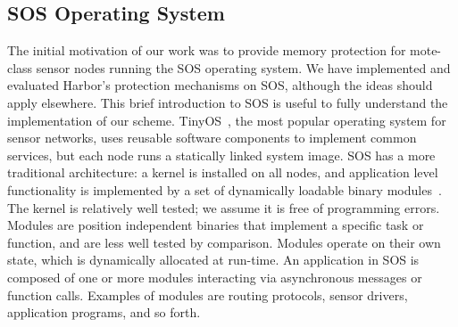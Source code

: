\subsection{SOS Operating System}
\label{sec:background}
% 
The initial motivation of our work was to provide memory protection
for mote-class sensor nodes running the SOS operating system.
% 
% 
We have implemented and evaluated Harbor's protection mechanisms on
SOS, although the ideas should apply elsewhere.
% 
This brief introduction to SOS is useful to fully understand the
implementation of our scheme.
% 
% 
% 
TinyOS~\cite{levis05t2}, the most popular operating system for sensor
networks, uses reusable software components to implement common
services, but each node runs a statically linked system image.
% 
% 
% 
SOS has a more traditional architecture: a kernel is
installed on all nodes, and
% 
application level functionality is implemented by a set of dynamically
loadable binary modules~\cite{ram05sos}.
% 
% 
% 
% 
% 
% 
% 
% 
% 
The kernel is relatively well tested; we assume it is free of
programming errors.
% 
Modules are position independent binaries that implement a specific
task or function, and are less well tested by comparison.
% 
Modules operate on their own state, which is dynamically allocated at
run-time.
% 
An application in SOS is composed of one or more modules interacting
via asynchronous messages or function calls.
% 
Examples of modules are routing protocols, sensor drivers, application
programs, and so forth.
%
